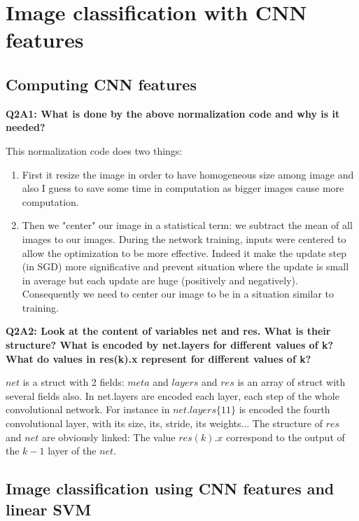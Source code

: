 \documentclass[a4paper,11pt]{exam}
\begin{document}
\clearpage

\section{Image classification with CNN features}

\subsection{Computing CNN features}

\textbf{Q2A1: What is done by the above normalization code and why is it needed?\\}

This normalization code does two things:
\begin{enumerate}
\item First it resize the image in order to have homogeneous size among image and also I guess to save some time in computation as bigger images cause more computation.
\item Then we "center" our image in a statistical term: we subtract the mean of all images to our images. During the network training, inputs were centered to allow the optimization to be more effective. Indeed it make the update step (in SGD) more significative and prevent situation where the update is small in average  but each update are huge (positively and negatively). Consequently we need to center our image to be in a situation similar to training.
\end{enumerate}


\textbf{Q2A2: Look at the content of variables net and res. What is their structure? What is encoded by net.layers for different values of k? What do values in res(k).x represent for different values of k?\\}

$net$ is a struct with 2 fields: $meta$ and $layers$ and $res$ is an array of struct with several fields also. In net.layers are encoded each layer, each step of the whole convolutional network. For instance in $net.layers\{11\}$ is encoded the fourth convolutional layer, with its size, its, stride, its weights... The structure of $res$ and $net$ are obviously linked: The value $res(k).x$ correspond to the output of the $k-1$ layer of the $net$.

\subsection{Image classification using CNN features and linear SVM}
\end{document}

